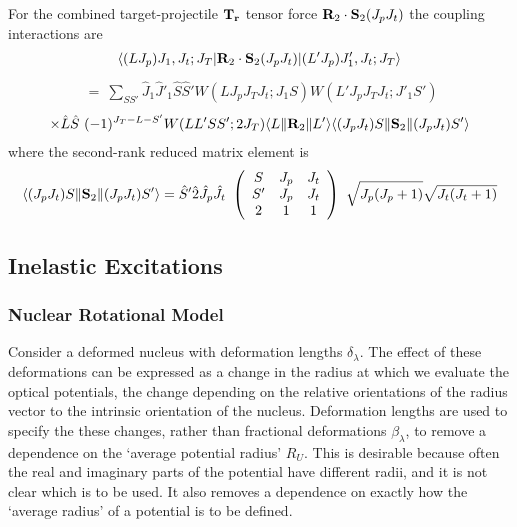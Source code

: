 \documentclass[11pt,a4paper]{article}
\begin{document}
For the combined target-projectile $ {\bf T_r} $ tensor force
$ {\bf R}_2 \cdot {\bf S}_2 ( J_p J_t ) $
the coupling interactions are
\begin{eqnarray} \nonumber
\left\langle (L J_p ) J_1 , J_t ; J_T |  {\bf R}_2 \cdot {\bf S}_2 ( J_p J_t )
                             | ( L' J_p ) J'_1 , J_t ; J_T \right\rangle
\end{eqnarray}\begin{eqnarray}  \nonumber
 ~=~
 \sum_{S S' }   \hat J_1 \hat J'_1 \hat S \hat S'
  W( L J_p J_T J_t ; J_1 S ) W( L' J_p J_T J_t ; J'_1 S' )
\end{eqnarray}
\begin{eqnarray}
\times \hat L \hat S\ (-1)^{J_T - L - S' } W(L L' S S' ; 2 J_T )
  \langle L \| {\bf R}_2 \| L'\rangle
  \langle ( J_p J_t )S \| {\bf S}_2 \| ( J_p J_t ) S'\rangle
\end{eqnarray}
where the second-rank reduced matrix element is
\begin{eqnarray} \nonumber
 \langle ( J_p J_t )S \| {\bf S}_2 \| ( J_p J_t ) S'\rangle
=
 \hat S' \hat 2 \hat J_p \hat J_t  ~
 \left ( \begin{array}{ccc}S & J_p & J_t \\S' & J_p & J_t\\2 & 1& 1\end{array} \right )  ~
\sqrt { J_p ( J_p + 1) } \sqrt { J_t ( J_t + 1) }
\end{eqnarray}
\subsection{Inelastic Excitations}
\subsubsection{Nuclear Rotational Model}

Consider a deformed nucleus with deformation lengths $\delta_\lambda$.
The effect of these deformations can be expressed as a change in the radius
at which we evaluate the optical potentials, the change depending on the
relative orientations of the radius vector to the intrinsic orientation
of the nucleus.  Deformation lengths are used to specify the these
changes, rather than fractional deformations $\beta_\lambda$,
to remove a dependence on the `average potential radius'
$R_U$. This is desirable because often the real and imaginary
parts of the potential have different radii, and it is not clear which is
to be used. It also removes a dependence on exactly how the `average
radius' of a potential is to be defined.
\end{document}
